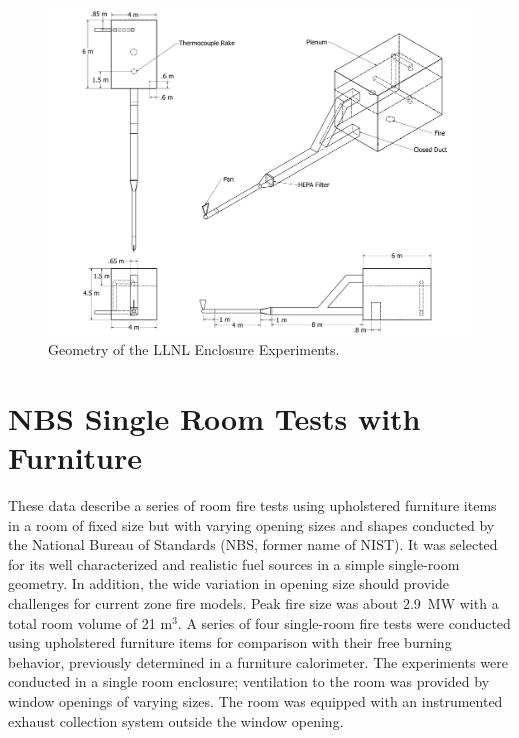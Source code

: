 \begin{figure}[\figoptions{b}]
\begin{center}
\includegraphics[width=6.5in]{FIGURES/LLNL_Enclosure/LLNL_Enclosure_Drawing}
\end{center}
\caption[Geometry of the LLNL Enclosure Experiments]{Geometry of the LLNL Enclosure Experiments.}
\label{LLNL_Enclosure_Drawing}
\end{figure}

\section{NBS Single Room Tests with Furniture}

These data describe a series of room fire tests using upholstered furniture items in a room of fixed size but with varying opening sizes and shapes \cite{Valid:Babrauskas_Flashover} conducted by the National Bureau of Standards (NBS, former name of NIST). It was selected for its well characterized and realistic fuel sources in a simple single-room geometry. In addition, the wide variation in opening size should provide challenges for current zone fire models. Peak fire size was about 2.9~MW with a total room volume of 21 m$^3$. A series of four single-room fire tests were conducted using upholstered furniture items for comparison with their free burning behavior, previously determined in a furniture calorimeter.  The experiments were conducted in a single room enclosure; ventilation to the room was provided by window openings of  varying sizes. The room was equipped with an instrumented exhaust collection system outside the window opening.  

